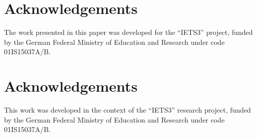 \documentclass{llncs}
\begin{document}
 



 



%



 

\section*{Acknowledgements}
The work presented in this paper was developed for the ``IETS3'' project, funded
by the German Federal Ministry of Education and Research under code
01IS15037A/B.
 \vspace{-0cm}
\section*{Acknowledgements}
\vspace{-.25cm}
This work was developed in the context of the ``IETS3'' research project, funded by the German Federal Ministry of Education
and Research under code 01IS15037A/B.
\vspace{-.5cm}


\end{document}
